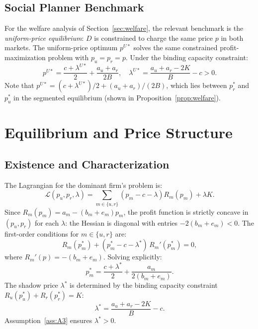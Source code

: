 \documentclass[12pt]{article}
\theoremstyle{plain}
\theoremstyle{definition}
\theoremstyle{remark}
\begin{document}
\subsection{Social Planner Benchmark}

For the welfare analysis of Section~\ref{sec:welfare}, the relevant benchmark is
the \emph{uniform-price equilibrium}: $D$ is constrained to charge the same price
$p$ in both markets.  The uniform-price optimum $p^{U*}$ solves the same
constrained profit-maximization problem with $p_u = p_r = p$.  Under the binding
capacity constraint:
\begin{equation}
  p^{U*} = \frac{c + \lambda^{U*}}{2} + \frac{a_u + a_r}{2B},
  \quad \lambda^{U*} = \frac{a_u + a_r - 2K}{B} - c > 0.
  \label{eq:uniform}
\end{equation}
Note that $p^{U*} = (c + \lambda^{U*})/2 + (a_u + a_r)/(2B)$, which lies between
$p_r^*$ and $p_u^*$ in the segmented equilibrium (shown in Proposition~\ref{prop:welfare}).

\section{Equilibrium and Price Structure}
\label{sec:equilibrium}

\subsection{Existence and Characterization}

The Lagrangian for the dominant firm's problem is:
\begin{equation}
  \mathcal{L}(p_u, p_r, \lambda) = \sum_{m \in \{u,r\}} (p_m - c - \lambda)R_m(p_m) + \lambda K.
\end{equation}
Since $R_m(p_m) = a_m - (b_m + e_m)p_m$, the profit function is strictly
concave in $(p_u, p_r)$ for each $\lambda$: the Hessian is diagonal with entries
$-2(b_m + e_m) < 0$.  The first-order conditions for $m \in \{u, r\}$ are:
\begin{equation}
  R_m(p_m^*) + (p_m^* - c - \lambda^*)\,R_m'(p_m^*) = 0,
\end{equation}
where $R_m'(p) = -(b_m + e_m)$.  Solving explicitly:
\begin{equation}
  p_m^* = \frac{c + \lambda^*}{2} + \frac{a_m}{2(b_m + e_m)}.
  \label{eq:pm}
\end{equation}
The shadow price $\lambda^*$ is determined by the binding capacity constraint
$R_u(p_u^*) + R_r(p_r^*) = K$:
\begin{equation}
  \lambda^* = \frac{a_u + a_r - 2K}{B} - c.
  \label{eq:lambda}
\end{equation}
Assumption~\ref{ass:A3} ensures $\lambda^* > 0$.
\end{document}
